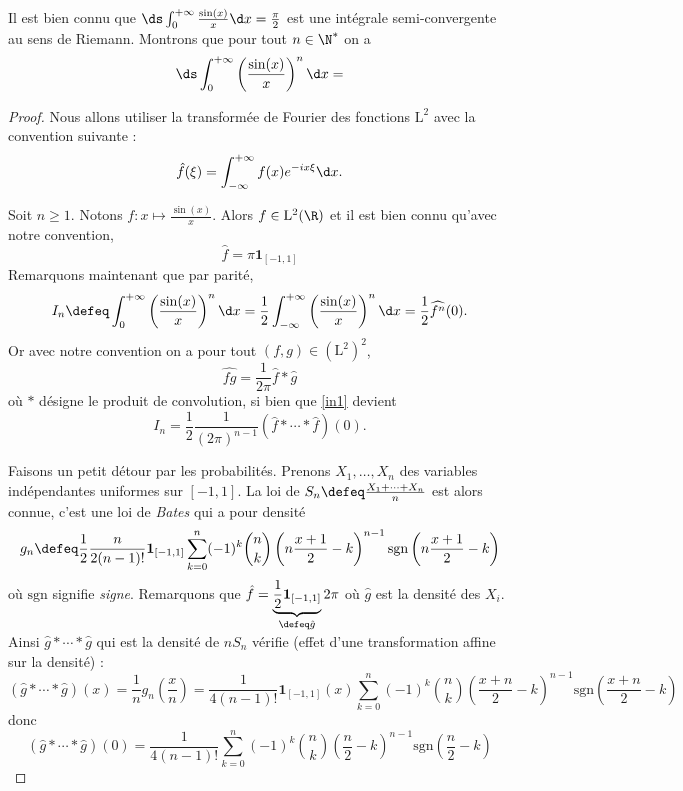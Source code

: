 \documentclass{notes}
\begin{document}

Il est bien connu que $\ds \int_{0}^{+\infty} \frac{\sin(x)}{x} \d x = \frac{\pi}{2}$ est une intégrale semi-convergente au sens de Riemann. Montrons que pour tout $n\in\N^{*}$ on a 
\[ \ds\int_0^{+\infty} \left( \frac{\sin(x)}{x} \right)^{n}\d x = \] 

\begin{proof}
  Nous allons utiliser la transformée de Fourier des fonctions $\mathrm L^{2}$ avec la convention suivante : 
\[ \hat f(\xi) = \int_{-\infty}^{+\infty} f(x) e^{-ix \xi} \d x. \]

Soit $n\geq 1$. Notons $f\colon x \mapsto \frac{\sin(x)}{x}$. Alors $f\in\mathrm L^{2}(\R)$ et il est bien connu qu'avec notre convention, 
\begin{equation}
\label{hatf}
\hat f = \pi \mathbf 1_{[-1,1]}
\end{equation}
Remarquons maintenant que par parité, 
\begin{equation}
  \label{in1}
  I_n \defeq \int_{0}^{+\infty} \left( \frac{\sin(x)}{x} \right)^{n} \d x = \frac 12 \int_{-\infty}^{+\infty} \left( \frac{\sin(x)}{x} \right)^{n} \d x = \frac 12 \widehat{f^{n}}(0). 
\end{equation}
Or avec notre convention on a pour tout $(f,g)\in (\mathrm L^{2})^{2}$, 
\[ \widehat{fg}= \frac 1{2\pi} \hat f \ast \hat g \]
où $\ast$ désigne le produit de convolution, si bien que \eqref{in1} devient  
\begin{equation}
  \label{in2}
  I_n = \frac 12 \frac{1}{(2\pi)^{n-1}} \left( \hat f\ast \cdots \ast \hat  f \right)(0).
\end{equation}

Faisons un petit détour par les probabilités. Prenons $X_1,\dots,X_n$ des variables indépendantes uniformes sur $[-1,1]$. La loi de $S_n \defeq \frac{X_1+\cdots+X_n}{n}$ est alors connue, c'est une loi de \emph{Bates} qui a pour densité 
\[ g_{n} \defeq  \frac 12 \frac{n}{2(n-1)!}  \mathbf 1_{[-1,1]} \sum_{k=0}^{n} (-1)^{k} \binom nk \left( n\frac{x+1}{2}- k \right)^{n-1} \mathrm{sgn}\left( n\frac{x+1}{2}- k \right) \]
où $\mathrm{sgn}$ signifie \emph{signe}. Remarquons que $\hat f = \underbrace{\frac 12 \mathbf 1_{[-1,1]}}_{\defeq \hat g} 2\pi$ où $\hat g$ est la densité des $X_i$. Ainsi $\hat g \ast \cdots \ast \hat g$ qui est la densité de $nS_n$ vérifie (effet d'une transformation affine sur la densité) : 
\[ \left( \hat g \ast \cdots \ast \hat g \right)(x) = \frac 1n g_{n}\left( \frac xn \right) =  \frac 1{4(n-1)!} \mathbf 1_{[-1,1]}(x) \sum_{k=0}^{n} (-1)^{k} \binom nk \left( \frac{x+n}{2}-k \right)^{n-1} \mathrm{sgn} \left( \frac{x+n}{2}-k  \right) \] 
donc \[ \left( \hat g\ast \cdots \ast \hat g \right)(0) = \frac 1{4(n-1)!} \sum_{k=0}^{n} (-1)^{k}\binom nk \left( \frac n2 - k \right)^{n-1}\mathrm{sgn} \left( \frac n2 - k \right) \]


\end{proof}
\end{document}
